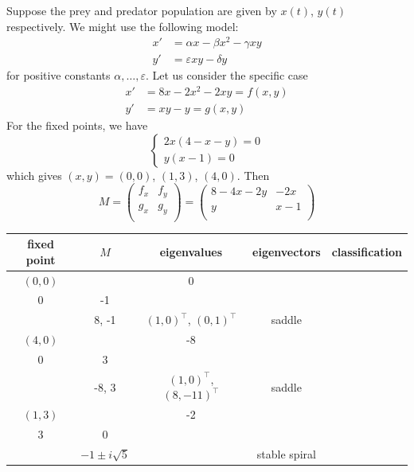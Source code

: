 \documentclass{../template/note}
\begin{document}
    \begin{example}
        Suppose the prey and predator population are given by \(x(t)\), \(y(t)\) respectively. We might use the following model:
        \begin{align*}
            x' &= \alpha x - \beta x^2 - \gamma xy \\
            y' &= \varepsilon xy - \delta y
        \end{align*}
        for positive constants \(\alpha, \dots, \varepsilon\). Let us consider the specific case
        \begin{align*}
            x' &= 8x - 2x^2 - 2xy = f(x, y) \\
            y' &= xy - y = g(x, y)
        \end{align*}
        For the fixed points, we have
        \[
            \begin{cases}
                2x(4 - x - y) = 0 \\
                y(x-1) = 0
            \end{cases}
        \]
        which gives \((x, y) = (0, 0)\), \((1, 3)\), \((4, 0)\). Then
        \[
            M = \begin{pmatrix}
             f_x & f_y \\
             g_x & g_y \\
            \end{pmatrix} = \begin{pmatrix}
             8-4x-2y & -2x \\
             y & x-1 \\
            \end{pmatrix}
        \]
        \begin{center}
            \begin{tabular}{c | c | c | c | c}
                fixed point & \(M\) & eigenvalues & eigenvectors & classification \\
                \hline
                \((0, 0)\) & \(\begin{pmatrix}
                8 & 0 \\
                0 & -1 \\
                \end{pmatrix}\) & 8, -1 & \((1, 0)^\intercal\), \((0, 1)^\intercal\) & saddle \\
                \hline
                \((4, 0)\) & \(\begin{pmatrix}
                -8 & -8 \\
                0 & 3 \\
                \end{pmatrix}\) & -8, 3 & \((1, 0)^\intercal\), \((8, -11)^\intercal\) & saddle \\
                \hline
                \((1, 3)\) & \(\begin{pmatrix}
                -2 & -2 \\
                3 & 0 \\
                \end{pmatrix}\) & \(-1\pm i\sqrt 5\) & & stable spiral \\
            \end{tabular}
            

\end{center}
\end{example}
\end{document}
